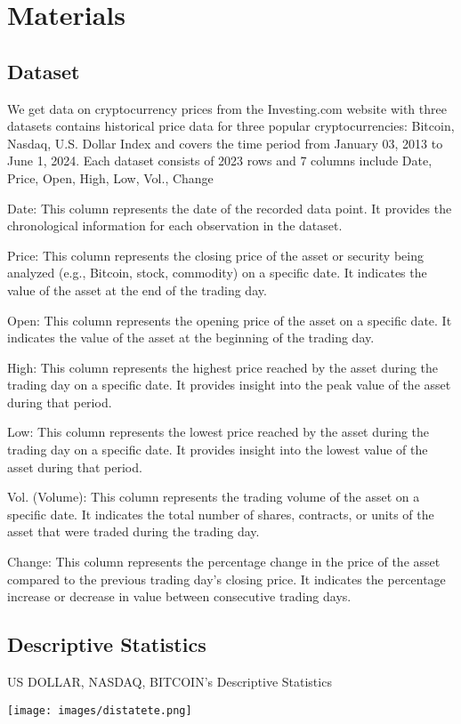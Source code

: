 \documentclass{ieeeojies}
\begin{document}
\section{Materials}
\subsection{Dataset}
We get data on cryptocurrency prices from the Investing.com website with three datasets contains historical price data for three popular cryptocurrencies: Bitcoin, Nasdaq, U.S. Dollar Index and covers the time period from January 03, 2013 to June 1, 2024. Each dataset consists of 2023 rows and 7 columns include Date, Price, Open, High, Low, Vol., Change 

Date: This column represents the date of the recorded data point. It provides the chronological information for each observation in the dataset.

Price: This column represents the closing price of the asset or security being analyzed (e.g., Bitcoin, stock, commodity) on a specific date. It indicates the value of the asset at the end of the trading day.

Open: This column represents the opening price of the asset on a specific date. It indicates the value of the asset at the beginning of the trading day.

High: This column represents the highest price reached by the asset during the trading day on a specific date. It provides insight into the peak value of the asset during that period.

Low: This column represents the lowest price reached by the asset during the trading day on a specific date. It provides insight into the lowest value of the asset during that period.

Vol. (Volume): This column represents the trading volume of the asset on a specific date. It indicates the total number of shares, contracts, or units of the asset that were traded during the trading day.

Change: This column represents the percentage change in the price of the asset compared to the previous trading day's closing price. It indicates the percentage increase or decrease in value between consecutive trading days.
\subsection{Descriptive Statistics}
\begin{table}[H]
  \centering
  \caption{US DOLLAR, NASDAQ, BITCOIN’s Descriptive Statistics}
  \texttt{[image: images/distatete.png]}
  \label{fig:cm}
\end{table}
\end{document}
